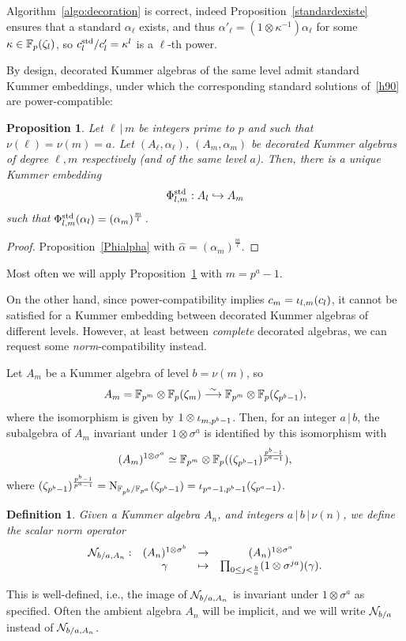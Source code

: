 \documentclass{sig-alternate}
\newtheorem{proposition}[theorem]{Proposition}
\newtheorem{definition}[theorem]{Definition}
\begin{document}
Algorithm~\ref{algo:decoration} is correct, indeed Proposition~\ref{standardexiste} ensures that
a standard $\alpha_{\ell}$ exists, and thus $\alpha'_\ell=(1\otimes\kappa^{-1})\alpha_{\ell}$
for some $\kappa\in\mathbb{F}_{p}(\zeta_l)$, so $c^{\mathrm{std}}_l/c'_l=\kappa^l$ is a $\ell$-th power.


By design, decorated Kummer algebras of the same level admit standard Kummer embeddings,
under which the corresponding standard solutions of~\eqref{h90} are power-compatible:
\begin{proposition}
\label{embedincomplete}
Let $\ell\,|\,m$ be integers prime to $p$ and such that $\nu(\ell)=\nu(m)=a$.
Let $(A_\ell,\alpha_\ell)$, $(A_m,\alpha_m)$ be decorated Kummer algebras
of degree $\ell,m$ respectively (and of the same level $a$).
Then, there is a unique Kummer embedding
\[ {\Phi^{\mathrm{std}}_{{l},{m}}}:A_l\hookrightarrow A_m \]
such that ${\Phi^{\mathrm{std}}_{{l},{m}}}(\alpha_l)=(\alpha_m)^{\frac{m}{l}}$.
\end{proposition}
\begin{proof}
Proposition~\ref{Phialpha} with $\hat{\alpha}=(\alpha_m)^{\frac{m}{\ell}}$.
\end{proof}
Most often we will apply Proposition~\ref{embedincomplete} with $m=p^a-1$.

On the other hand, 
since power-compatibility implies $c_m={\iota_{{l},{m}}}(c_l)$,
it cannot be satisfied for a Kummer embedding
between decorated Kummer algebras of different levels.
However, at least between \emph{complete} decorated algebras, we can request some \emph{norm}-compatibility
instead.

Let $A_m$ be a Kummer algebra of level $b=\nu(m)$, so
\[ A_m=\mathbb{F}_{p^m}\otimes\mathbb{F}_{p}(\zeta_m)\overset{\sim}{\longrightarrow}\mathbb{F}_{p^m}\otimes\mathbb{F}_{p}(\zeta_{p^b-1}), \]
where the isomorphism is given by $1\otimes{\iota_{{m},{p^b-1}}}$.
Then, for an integer $a\,|\,b$,
the subalgebra of $A_m$ invariant under $1\otimes\sigma^a$ is identified
by this isomorphism with
\[ (A_m)^{1\otimes\sigma^a}\simeq\mathbb{F}_{p^m}\otimes\mathbb{F}_{p}((\zeta_{p^b-1})^{\frac{p^b-1}{p^a-1}}), \]
where $(\zeta_{p^b-1})^{\frac{p^b-1}{p^a-1}}=\operatorname{N}_{\mathbb{F}_{p^b}/\mathbb{F}_{p^a}}(\zeta_{p^b-1})={\iota_{{p^a-1},{p^b-1}}}(\zeta_{p^a-1})$.

\begin{definition}
\label{def:norm}
Given a Kummer algebra $A_n$, and integers $a\,|\,b\,|\,\nu(n)$, we define
the \emph{scalar norm} operator
\[
\begin{array}{cccc}
  \mathcal{N}_{b/a,A_n}: & (A_n)^{1\otimes\sigma^b} & \to & (A_n)^{1\otimes\sigma^a} \\
  & \gamma & \mapsto & \prod_{0\leq j<\frac{b}{a}} (1 \otimes \sigma^{ja})(\gamma).
\end{array}
\]
\end{definition}
This is well-defined, i.e., the image of $\mathcal{N}_{b/a,A_n}$ is invariant under $1\otimes\sigma^a$ as specified.
Often the ambient algebra $A_n$ will be implicit,
and we will write $\mathcal{N}_{b/a}$ instead of $\mathcal{N}_{b/a,A_n}$.
\end{document}
